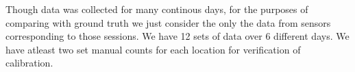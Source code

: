 Though data was collected for many continous days, for the purposes of comparing with ground truth we just consider the only the data from sensors corresponding to those sessions. We have 12 sets of data over 6 different days. We have atleast two set manual counts for each location for verification of calibration.

\begin{figure}
	\centering
	\hspace{20pt}

\end{figure}
